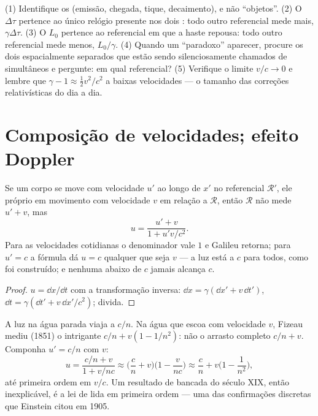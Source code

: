 \begin{method}\label{met:b3:relativistic-kinematics:method}
(1) Identifique os \emph{} (emissão, chegada, tique,
decaimento), e não ``objetos''. (2) O  $\Delta\tau$
pertence ao único relógio presente nos dois : todo outro
referencial mede mais, $\gamma\Delta\tau$. (3) O 
$L_0$ pertence ao referencial em que a haste repousa: todo outro
referencial mede menos, $L_0/\gamma$. (4) Quando um ``paradoxo''
aparecer, procure os dois  espacialmente separados que estão
sendo silenciosamente chamados de simultâneos e pergunte: em qual
referencial? (5) Verifique o limite $v/c \to 0$ e lembre que
$\gamma - 1 \approx \tfrac12 v^2/c^2$ a baixas velocidades --- o
tamanho das correções relativísticas do dia a dia.
\end{method}

\section{Composição de velocidades; efeito Doppler}

\begin{proposition}\label{prop:b3:relativistic-kinematics:addition}
Se um corpo se move com velocidade $u'$ ao longo de $x'$ no referencial
$\mathcal R'$, ele próprio em movimento com velocidade $v$ em relação a
$\mathcal R$, então $\mathcal R$ não mede $u' + v$, mas
\[
u = \frac{u' + v}{1 + u'v/c^2} .
\]
Para as velocidades cotidianas o denominador vale $1$ e Galileu
retorna; para $u' = c$ a fórmula dá $u = c$ qualquer que seja $v$ --- a
luz está a $c$ para todos, como foi construído; e nenhuma  abaixo de $c$ jamais alcança $c$.
\end{proposition}

\begin{proof}
$u = \dd x/\dd t$ com a transformação inversa: $\dd x =
\gamma(\dd x' + v\,\dd t')$, $\dd t = \gamma(\dd t' + v\,\dd x'/c^2)$;
divida.
\end{proof}

\begin{example}\label{ex:b3:relativistic-kinematics:fizeau}
A luz na água parada viaja a $c/n$. Na água que escoa com velocidade
$v$, Fizeau mediu (1851) o intrigante $c/n + v(1 - 1/n^2)$: não o
arrasto completo $c/n + v$. Componha $u' = c/n$ com $v$:
\[
u = \frac{c/n + v}{1 + v/nc}
\approx \Big(\frac{c}{n} + v\Big)\Big(1 - \frac{v}{nc}\Big)
\approx \frac{c}{n} + v\Big(1 - \frac{1}{n^2}\Big) ,
\]
até primeira ordem em $v/c$. Um resultado de bancada do século XIX,
então inexplicável, é a lei de  lida em
primeira ordem --- uma das confirmações discretas que Einstein citou em
1905.
\end{example}

